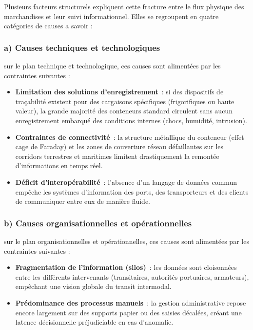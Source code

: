 Plusieurs facteurs structurels expliquent cette fracture entre le flux physique des marchandises et leur suivi informationnel. Elles se regroupent en quatre catégories de causes a savoir :

\subsubsection*{a) Causes techniques et technologiques}

  sur le plan technique et technologique, ces causes sont alimentées par les contraintes suivantes :
\begin{itemize}[label=\textcolor{argosblue}{\textbf{>}}]
\item \textbf{Limitation des solutions d'enregistrement}~: si des dispositifs de traçabilité existent pour des cargaisons spécifiques (frigorifiques ou haute valeur), la grande majorité des conteneurs standard circulent sans aucun enregistrement embarqué des conditions internes (chocs, humidité, intrusion).
\item \textbf{Contraintes de connectivité}~: la structure métallique du conteneur (effet cage de Faraday) et les zones de couverture réseau défaillantes sur les corridors terrestres et maritimes limitent drastiquement la remontée d'informations en temps réel.
\item \textbf{Déficit d'interopérabilité}~: l'absence d'un langage de données commun empêche les systèmes d'information des ports, des transporteurs et des clients de communiquer entre eux de manière fluide.
\end{itemize}

\subsubsection*{b) Causes organisationnelles et opérationnelles}
  sur le plan organisationnelles et opérationnelles, ces causes sont alimentées par les contraintes suivantes :
\begin{itemize}
\item \textbf{Fragmentation de l'information (silos)}~: les données sont cloisonnées entre les différents intervenants (transitaires, autorités portuaires, armateurs), empêchant une vision globale du transit intermodal.
\item \textbf{Prédominance des processus manuels}~: la gestion administrative repose encore largement sur des supports papier ou des saisies décalées, créant une latence décisionnelle préjudiciable en cas d'anomalie.
\end{itemize}

